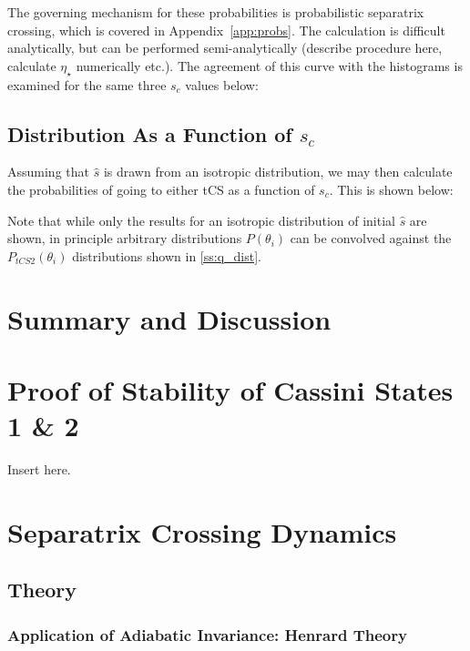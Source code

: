 \documentclass[
        fleqn,
        usenatbib,
        referee,
    ]{mnras}
\newcommand*{\p}[1]{\left(#1\right)}
\begin{document}

The governing mechanism for these probabilities is probabilistic separatrix
crossing, which is covered in Appendix~\ref{app:probs}. The calculation is
difficult analytically, but can be performed semi-analytically (describe
procedure here, calculate $\eta_{\star}$ numerically etc.). The agreement of
this curve with the histograms is examined for the same three $s_c$ values
below:

\subsection{Distribution As a Function of $s_c$}\label{ss:s_c_dist}

Assuming that $\hat{s}$ is drawn from an isotropic distribution, we may then
calculate the probabilities of going to either tCS as a function of $s_c$. This
is shown below:

Note that while only the results for an isotropic distribution of initial
$\hat{s}$ are shown, in principle arbitrary distributions $P\p{\theta_i}$ can be
convolved against the $P_{tCS2}\p{\theta_i}$ distributions shown in
\autoref{ss:q_dist}.

\section{Summary and Discussion}\label{s:summary}




\appendix
\section{Proof of Stability of Cassini States 1 \& 2}\label{app:cs_stab}

Insert here.

\section{Separatrix Crossing Dynamics}

\subsection{Theory}\label{app:sep_crossing_dynamics}

\subsubsection{Application of Adiabatic Invariance: Henrard Theory}
\end{document}
